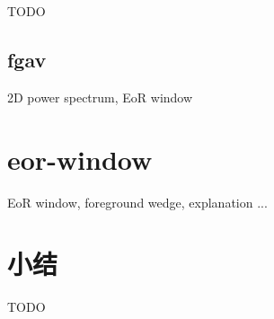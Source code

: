 TODO

\subsection{\acl*{fgav}}  %

2D power spectrum, EoR window


\section{\acl*{eor-window}}  %
\label{sec:eor-window}

EoR window, foreground wedge, explanation ...


\section{小结}

TODO


